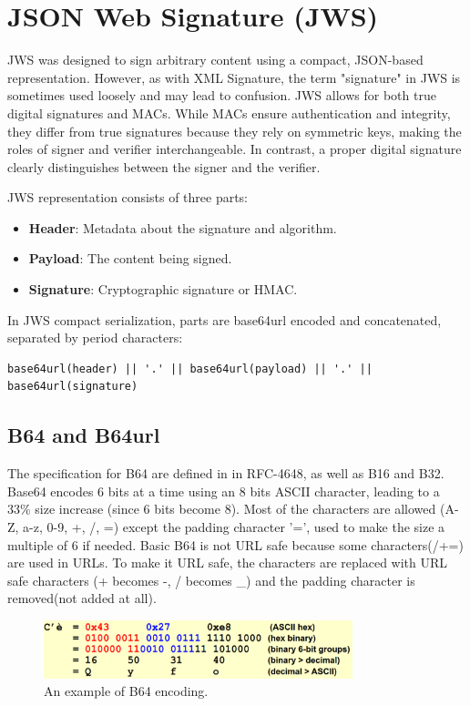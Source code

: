 \section{JSON Web Signature (JWS)}
JWS was designed to sign arbitrary content using a compact, JSON-based
representation. However, as with XML Signature, the term "signature"
in JWS is sometimes used loosely and may lead to confusion. JWS allows
for both true digital signatures and MACs. While MACs ensure
authentication and integrity, they differ from true signatures because
they rely on symmetric keys, making the roles of signer and verifier
interchangeable. In contrast, a proper digital signature clearly
distinguishes between the signer and the verifier.

JWS representation consists of three parts:
\begin{itemize}
  \item \textbf{Header}: Metadata about the signature and algorithm.
  \item \textbf{Payload}: The content being signed.
  \item \textbf{Signature}: Cryptographic signature or HMAC.
\end{itemize}

In JWS compact serialization, parts are base64url encoded and
concatenated, separated by period characters:
\begin{verbatim}
base64url(header) || '.' || base64url(payload) || '.' || base64url(signature)
\end{verbatim}

\subsection{B64 and B64url}
The specification for B64 are defined in in RFC-4648, as well as B16
and B32. Base64 encodes 6 bits at a time using an 8 bits ASCII
character, leading to a 33\% size increase (since 6 bits become 8). 
Most of the characters are allowed (A-Z, a-z, 0-9, +, /, =) except the 
padding character '=', used to make the size a multiple of 6 if
needed. Basic B64 is not URL safe because some characters(/+=) are
used in URLs. To make it URL safe, the characters are replaced with 
URL safe characters (+ becomes -, / becomes \_) and the padding 
character is removed(not added at all).

\begin{figure}[H]
  \centering
  \includegraphics[width=0.8\textwidth]{img/b64 ex.png}
  \caption{An example of B64 encoding.}
  \label{fig:b64 ex}
\end{figure}

